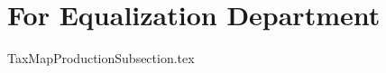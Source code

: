 \documentclass[class=book , crop=false]{standalone}
\begin{document}
\section{For Equalization Department}
{TaxMapProductionSubsection.tex}
\end{document}
